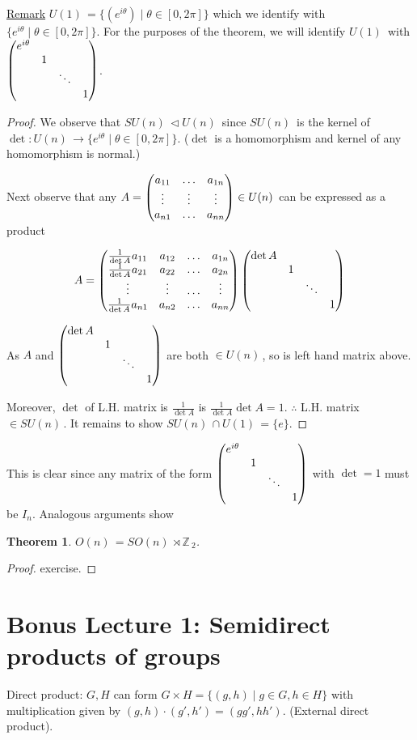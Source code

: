 \documentclass[12pt,a4paper]{article}
\newcommand{\zZ}{\ensuremath{\mathbb{Z}\,}}
\newcommand{\gon}{\ensuremath{O(n)\,}}
\newcommand{\gun}{\ensuremath{U(n)\,}}
\newcommand{\guk}[1]{\ensuremath{U(#1)\,}}
\newcommand{\gson}{\ensuremath{SO(n)\,}}
\newcommand{\gsun}{\ensuremath{SU(n)\,}}
\newcommand{\ul}[1]{\underline{#1}}
\newtheorem{thm}{Theorem}[subsubsection]
\begin{document}
\ul{Remark} $\guk{1}=\{(e^{i\theta})\mid \theta \in [0,2\pi]\}$ which we identify with $\{e^{i\theta} \mid \theta \in [0,2\pi] \}$. For the purposes of the theorem, we will identify $\guk{1}$ with $\pmqty{\dmat{e^{i\theta},1,\ddots,1}}$.

\begin{proof}
We observe that $\gsun \lhd \gun$ since $\gsun$ is the kernel of $\det : \gun \to \{e^{i\theta} \mid \theta \in [0,2\pi] \}$. ($\det$ is a homomorphism and kernel of any homomorphism is normal.)

Next observe that any $A=\pmqty{a_{11} & \ldots & a_{1n} \\ \vdots & \vdots & \vdots \\ a_{n1} & \ldots & a_{nn}} \in \gun$ can be expressed as a product

\[A=\pmqty{ \frac{1}{\det A} a_{11} & a_{12} & \ldots & a_{1n} \\ \frac{1}{\det A} a_{21} & a_{22} & \ldots & a_{2n} \\ \vdots & \vdots & \ldots & \vdots \\ \frac{1}{\det A} a_{n1} & a_{n2} & \ldots & a_{nn}}\pmqty{\dmat{\det A, 1, \ddots, 1}}\]

As $A$ and $\pmqty{\dmat{\det A, 1, \ddots, 1}}$ are both $\in \gun$, so is left hand matrix above.

Moreover, $\det$ of L.H. matrix is $\frac{1}{\det A}$ is $\frac{1}{\det A}\det A = 1$. $\therefore $ L.H. matrix $\in \gsun$. It remains to show $\gsun \cap \guk{1}=\{e\}$.
\end{proof}

This is clear since any matrix of the form $\pmqty{\dmat{e^{i\theta},1,\ddots,1}}$ with $\det =1$ must be $I_n$. Analogous arguments show 

\begin{thm}
$\gon =\gson \rtimes \zZ_2$.
\end{thm}

\begin{proof}
exercise.
\end{proof}

\section{Bonus Lecture 1: Semidirect products of groups}

Direct product: $G,H$ can form $G\times H=\{(g,h)\mid g\in G, h\in H\}$ with multiplication given by $(g,h)\cdot (g',h')=(gg',hh')$. (External direct product).
\end{document}
